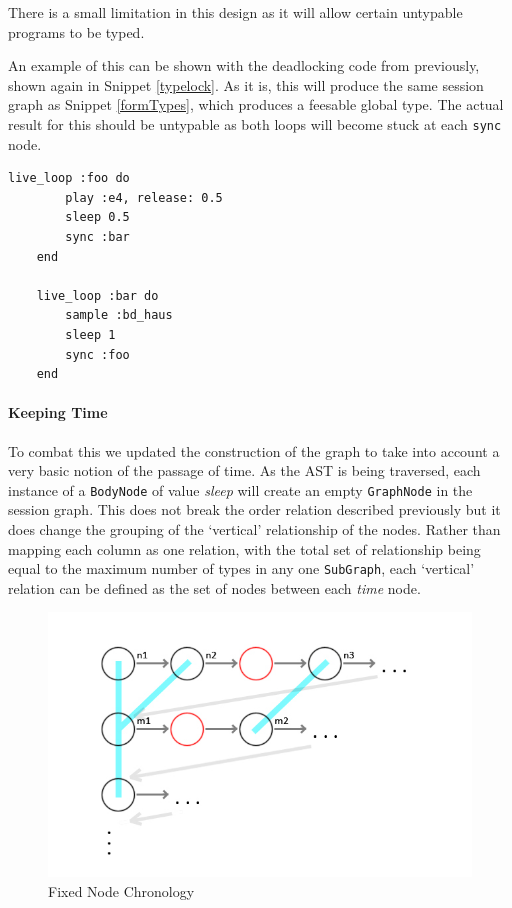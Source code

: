 \documentclass[11pt, abstracton, twoside, titlepage=true]{scrartcl}
\begin{document}
There is a small limitation in this design as it will allow certain untypable
programs to be typed.

An example of this can be shown with the deadlocking code from previously,
shown again in Snippet \ref{typelock}. As it is, this will produce the same session
graph as Snippet \ref{formTypes}, which produces a feesable global type.
The actual result for this should be untypable as both loops will become stuck
at each \texttt{sync} node. 

\begin{minipage}{\textwidth}
	\begin{lstlisting}[style = sonicpi]
	live_loop :foo do
	    play :e4, release: 0.5
	    sleep 0.5
	    sync :bar
	end

	live_loop :bar do
	    sample :bd_haus
	    sleep 1
	    sync :foo
	end
	\end{lstlisting}
	 \label{typelock}
\end{minipage}

\paragraph{Keeping Time}
To combat this we updated the construction of the graph to take into account
a very basic notion of the passage of time. As the AST is being traversed, each
instance of a \texttt{BodyNode} of value \emph{sleep} will create an empty
\texttt{GraphNode} in the session graph. This does not break the order relation
described previously but it does change the grouping of the `vertical' 
relationship of the nodes. Rather than mapping each column as one relation, with
the total set of relationship being equal to the maximum number of types in
any one \texttt{SubGraph}, each `vertical' relation can be defined as the
set of nodes between each \emph{time} node.

\begin{figure}[h!]
	\centering
	\includegraphics[width=\textwidth]{images/GraphTwo.jpg}
	\caption{Fixed Node Chronology}
\end{figure}
\end{document}
